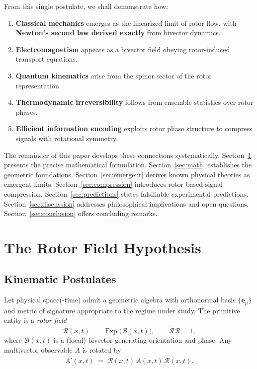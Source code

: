 \documentclass[11pt,a4paper]{article}
\newcommand{\e}{\mathbf{e}}
\newcommand{\rev}[1]{\widetilde{#1}}           %
\newcommand{\Exp}{\operatorname{Exp}}
\newcommand{\Rotor}{\mathcal{R}}
\newcommand{\Biv}{\mathcal{B}}
\theoremstyle{definition}
\theoremstyle{plain}
\theoremstyle{remark}
\begin{document}
From this single postulate, we shall demonstrate how:

\begin{enumerate}[leftmargin=*,itemsep=3pt]
  \item \textbf{Classical mechanics} emerges as the linearized limit of rotor flow, with \textbf{Newton's second law derived exactly} from bivector dynamics.
  \item \textbf{Electromagnetism} appears as a bivector field obeying rotor-induced transport equations.
  \item \textbf{Quantum kinematics} arise from the spinor sector of the rotor representation.
  \item \textbf{Thermodynamic irreversibility} follows from ensemble statistics over rotor phases.
  \item \textbf{Efficient information encoding} exploits rotor phase structure to compress signals with rotational symmetry.
\end{enumerate}

The remainder of this paper develops these connections systematically. Section~\ref{sec:hypothesis} presents the precise mathematical formulation. Section~\ref{sec:math} establishes the geometric foundations. Section~\ref{sec:emergent} derives known physical theories as emergent limits. Section~\ref{sec:compression} introduces rotor-based signal compression. Section~\ref{sec:predictions} states falsifiable experimental predictions. Section~\ref{sec:discussion} addresses philosophical implications and open questions. Section~\ref{sec:conclusion} offers concluding remarks.

\vspace{1em}

\section{The Rotor Field Hypothesis}\label{sec:hypothesis}

\subsection{Kinematic Postulates}

Let physical space(-time) admit a geometric algebra with orthonormal basis $\{\e_\mu\}$ and metric of signature appropriate to the regime under study. The primitive entity is a \emph{rotor field}
\begin{equation}
  \Rotor(x,t) \;=\; \Exp\!\big(\Biv(x,t)\big),
  \qquad \rev{\Rotor}\Rotor = 1,
  \label{eq:rotor}
\end{equation}
where $\Biv(x,t)$ is a (local) bivector generating orientation and phase. Any multivector observable $A$ is rotated by
\begin{equation}
  A'(x,t) \;=\; \Rotor(x,t)\, A(x,t)\, \rev{\Rotor}(x,t).
\end{equation}
\end{document}

